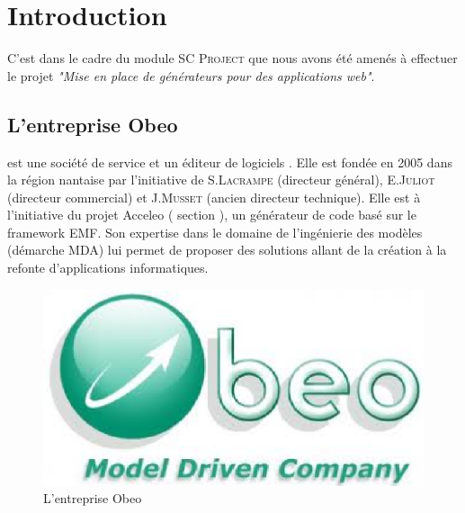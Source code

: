 \chapter{Introduction}\label{chap:Intro}
C'est dans le cadre du module \textsc{SC Project} que nous avons été amenés à effectuer le projet \textit{"Mise en place de générateurs pour des applications web"}. 


\section{L'entreprise Obeo}
\kwobeo{} est une société de service et un éditeur de logiciels \cite{obeo}.  Elle est fondée en 2005 dans la région nantaise par l'initiative de S.\textsc{Lacrampe} (directeur général), E.\textsc{Juliot} (directeur commercial) et J.\textsc{Musset} (ancien directeur technique). Elle est à l'initiative du projet Acceleo (\cf{} section \cite{acceleo}), un générateur de code basé sur le framework EMF. Son expertise dans le domaine de l'ingénierie des modèles (démarche MDA) lui permet de proposer des solutions allant de la création à la refonte d'applications informatiques. 
\begin{figure}[htb]
  \centering
  \includegraphics[scale=.4]{img/logoobeo.eps}
  \caption{L'entreprise Obeo}
\end{figure}

